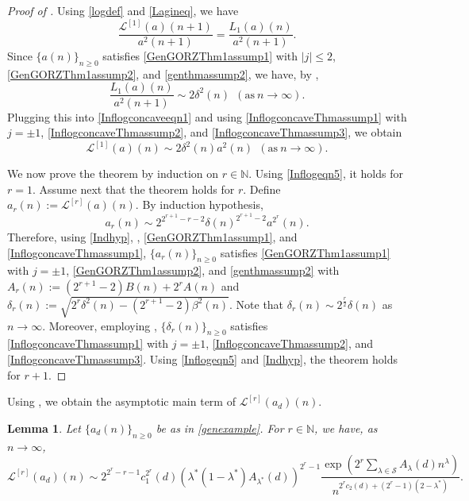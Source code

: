 \documentclass[11pt,reqno,a4paper]{amsart}
\renewcommand{\b}{\beta}
\renewcommand{\d}{{\delta}}
\renewcommand{\l}{\lambda}
\renewcommand{\(}{\left\(}
\renewcommand{\)}{\right\)}
\numberwithin{equation}{section}
\theoremstyle{plain}
\newtheorem{lemma}[theorem]{Lemma}
\theoremstyle{definition} %
\numberwithin{equation}{section}
\begin{document}
\begin{proof}[Proof of ]
	Using \eqref{logdef} and \eqref{Lagineq}, we have  
	\begin{equation}\label{Inflogconcaveeqn1}
	\frac{\mathcal{L}^{[1]}(a)(n+1)}{a^2(n+1)}
	=\frac{L_1(a)(n)}{a^2(n+1)}.
	\end{equation}
	Since $\{a(n)\}_{n\ge 0}$ satisfies 
	\ref{GenGORZThm1assump1} with $|j|\le 2$, \ref{GenGORZThm1assump2}, and \ref{genthmassump2}, we have, by  , 
	\[
	\frac{L_1(a)(n)}{a^2(n+1)}\sim 
	2\d^2(n)\ \ (\text{as}\ n\to \infty).
	\]
	Plugging this into \eqref{Inflogconcaveeqn1} and using \ref{InflogconcaveThmassump1} with $j=\pm 1$, \ref{InflogconcaveThmassump2}, and \ref{InflogconcaveThmassump3}, we obtain
	\begin{equation}\label{Inflogeqn5}
	\mathcal{L}^{[1]}(a)(n)\sim 2\d^2(n)a^2(n)\ \ (\text{as}\ n\to \infty).
	\end{equation}
	
	We now prove the theorem by induction on $r\in \mathbb{N}$. Using \eqref{Inflogeqn5}, it holds for $r=1$. Assume next that the theorem holds for $r$. Define $a_r(n):=\mathcal{L}^{[r]}(a)(n)$. By induction hypothesis,
	\begin{equation}\label{Indhyp}
	a_r(n)\sim  2^{2^{r+1}-r-2}\d(n)^{2^{r+1}-2} a^{2^r}\!(n). 
	\end{equation}
 Therefore, using \eqref{Indhyp}, , \ref{GenGORZThm1assump1}, and \ref{InflogconcaveThmassump1}, %
	$\{a_r(n)\}_{n\ge 0}$ satisfies \ref{GenGORZThm1assump1} with $j=\pm 1$, \ref{GenGORZThm1assump2}, and \ref{genthmassump2} with $A_r(n):=(2^{r+1}-2)B(n)+2^rA(n)$ and $\d_r(n):=\sqrt{2^r\d^2(n)-\left(2^{r+1}-2\right)\b^2(n)}$. Note that $\d_r(n)\sim 2^{\frac r2}\d(n)$ as $n\to \infty$. Moreover, employing , $\{\d_r(n)\}_{n\ge 0}$ satisfies \ref{InflogconcaveThmassump1} with $j=\pm 1$, \ref{InflogconcaveThmassump2}, and \ref{InflogconcaveThmassump3}. Using \eqref{Inflogeqn5} and \eqref{Indhyp}, the theorem holds for $r+1$.\qedhere
\end{proof}






Using , we obtain the asymptotic main term of $\mathcal{L}^{[r]}(a_d)(n)$.

\begin{lemma}\label{Inftlogconcave:lem}
Let $\{a_d(n)\}_{n\ge 0}$ be as in \eqref{genexample}. For $r\in \mathbb{N}$, we have,  as $n\to \infty$,
	\[
	\mathcal{L}^{[r]}(a_d)(n)\sim 2^{2^r-r-1}c_1^{2^r}(d)\left(\l^*\left(1-\l^*\right)A_{\l^*}(d)\right)^{2^r-1}\frac{\exp\left(2^r\sum_{\l\in \mathcal{S}}A_{\l}(d)n^{\l}\right)}{n^{2^rc_2(d)+(2^r-1)(2-\l^*)}}.
	\]
\end{lemma}
\end{document}
